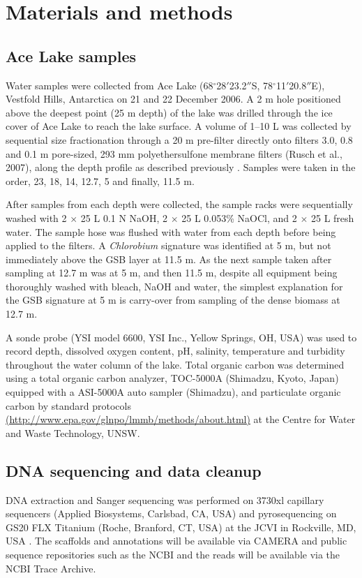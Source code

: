 
\section{Materials and methods}
\label{ch:mm}
\subsection{Ace Lake samples}
Water samples were collected from Ace Lake (68$^{\circ}$28$'$23.2$''$S, 78$^{\circ}$11$'$20.8$''$E), Vestfold Hills, Antarctica on 21 and 22 December 2006. 
A 2 m hole positioned above the deepest point (25 m depth) of the lake was drilled through the ice cover of Ace Lake to reach the lake surface.
A volume of 1--10 L was collected by sequential size fractionation through a 20 \textmu{}m pre-filter directly onto filters 3.0, 0.8 and 0.1 \textmu{}m pore-sized, 293 mm polyethersulfone membrane filters (Rusch et al., 2007), along the depth profile as described previously \cite{Ng2010a}.
Samples were taken in the order, 23, 18, 14, 12.7, 5 and finally, 11.5 m.

After samples from each depth were collected, the sample racks were sequentially washed with 2 $\times$ 25 L 0.1 N NaOH, 2 $\times$ 25 L 0.053\% NaOCl, and 2 $\times$ 25 L fresh water. 
The sample hose was flushed with water from each depth before being applied to the filters. 
A \emph{Chlorobium} signature was identified at 5 m, but not immediately above the \ac{GSB} layer at 11.5 m. 
As the next sample taken after sampling at 12.7 m was at 5 m, and then 11.5 m, despite all equipment being thoroughly washed with bleach, NaOH and water, 
the simplest explanation for the \ac{GSB} signature at 5 m is carry-over from sampling of the dense biomass at 12.7 m. 

A sonde probe (\textsc{YSI} model 6600, \textsc{YSI} Inc., Yellow Springs, \textsc{OH}, \textsc{USA}) was used to record depth, dissolved oxygen content, pH, salinity, temperature and turbidity throughout the water column of the lake. 
Total organic carbon was determined using a total organic carbon analyzer, TOC-5000A (Shimadzu, Kyoto, Japan) equipped with a \textsc{ASI}-5000A auto sampler (Shimadzu), and particulate organic carbon by standard protocols 
\url{(http://www.epa.gov/glnpo/lmmb/methods/about.html)} 
at the Centre for Water and Waste Technology, \textsc{UNSW}.

\subsection{\textsc{DNA} sequencing and data cleanup}
\textsc{DNA} extraction and Sanger sequencing was performed on 3730xl capillary sequencers (Applied Biosystems, Carlsbad, \textsc{CA}, \textsc{USA}) and pyrosequencing on \textsc{GS20 FLX} Titanium (Roche, Branford, \textsc{CT}, \textsc{USA}) at the \acl{JCVI} in Rockville, \textsc{MD}, \textsc{USA} \cite{Rusch2007}. 
The scaffolds and annotations will be available via \ac{CAMERA} and public sequence repositories such as the \ac{NCBI} and the reads will be available via the \ac{NCBI} Trace Archive. 

